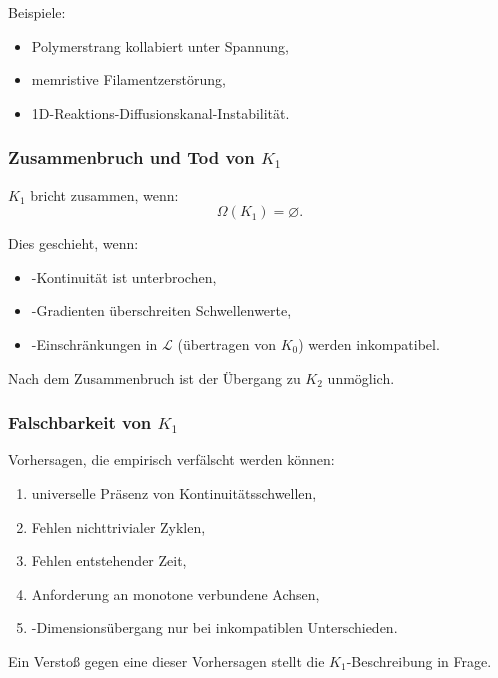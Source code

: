 Beispiele:
\begin{itemize}
    \item Polymerstrang kollabiert unter Spannung,
    \item memristive Filamentzerstörung,
    \item 1D-Reaktions-Diffusionskanal-Instabilität.
\end{itemize}

\subsubsection{Zusammenbruch und Tod von \texorpdfstring{$K_1$}{K_1}}

$K_1$ bricht zusammen, wenn:
\[
\Omega(K_1) = \varnothing.
\]

Dies geschieht, wenn:
\begin{itemize}
    Die \item-Kontinuität ist unterbrochen,
    \item-Gradienten überschreiten Schwellenwerte,
    \item-Einschränkungen in $\mathcal{L}$ (übertragen von $K_0$) werden
          inkompatibel.
\end{itemize}

Nach dem Zusammenbruch ist der Übergang zu $K_2$ unmöglich.

\subsubsection{Falschbarkeit von \texorpdfstring{$K_1$}{K_1}}

Vorhersagen, die empirisch verfälscht werden können:
\begin{enumerate}
    \item universelle Präsenz von Kontinuitätsschwellen,
    \item Fehlen nichttrivialer Zyklen,
    \item Fehlen entstehender Zeit,
    \item Anforderung an monotone verbundene Achsen,
    \item-Dimensionsübergang nur bei inkompatiblen Unterschieden.
\end{enumerate}

Ein Verstoß gegen eine dieser Vorhersagen stellt die $K_1$-Beschreibung in Frage.

